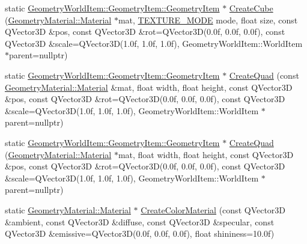 \begin{DoxyCompactItemize}
static \mbox{\hyperlink{class_geometry_engine_1_1_geometry_world_item_1_1_geometry_item_1_1_geometry_item}{Geometry\+World\+Item\+::\+Geometry\+Item\+::\+Geometry\+Item}} $\ast$ \mbox{\hyperlink{class_geometry_engine_1_1_geometry_factory_a63e36d406e73170b39a39e7bbec45231}{Create\+Cube}} (\mbox{\hyperlink{class_geometry_engine_1_1_geometry_material_1_1_material}{Geometry\+Material\+::\+Material}} $\ast$mat, \mbox{\hyperlink{namespace_geometry_engine_a8502c4e17f01f5fe92f879776759e572}{T\+E\+X\+T\+U\+R\+E\+\_\+\+M\+O\+DE}} mode, float size, const Q\+Vector3D \&pos, const Q\+Vector3D \&rot=Q\+Vector3D(0.\+0f, 0.\+0f, 0.\+0f), const Q\+Vector3\+D \&scale=\+Q\+Vector3\+D(1.\+0f, 1.\+0f, 1.\+0f), Geometry\+World\+Item\+::\+World\+Item $\ast$parent=nullptr)
\item 
static \mbox{\hyperlink{class_geometry_engine_1_1_geometry_world_item_1_1_geometry_item_1_1_geometry_item}{Geometry\+World\+Item\+::\+Geometry\+Item\+::\+Geometry\+Item}} $\ast$ \mbox{\hyperlink{class_geometry_engine_1_1_geometry_factory_a8a198efff4ed85106a7bffb65274a5e5}{Create\+Quad}} (const \mbox{\hyperlink{class_geometry_engine_1_1_geometry_material_1_1_material}{Geometry\+Material\+::\+Material}} \&mat, float width, float height, const Q\+Vector3D \&pos, const Q\+Vector3D \&rot=Q\+Vector3D(0.\+0f, 0.\+0f, 0.\+0f), const Q\+Vector3\+D \&scale=\+Q\+Vector3\+D(1.\+0f, 1.\+0f, 1.\+0f), Geometry\+World\+Item\+::\+World\+Item $\ast$parent=nullptr)
\item 
static \mbox{\hyperlink{class_geometry_engine_1_1_geometry_world_item_1_1_geometry_item_1_1_geometry_item}{Geometry\+World\+Item\+::\+Geometry\+Item\+::\+Geometry\+Item}} $\ast$ \mbox{\hyperlink{class_geometry_engine_1_1_geometry_factory_a32b10346ae782021112612556d8afe05}{Create\+Quad}} (\mbox{\hyperlink{class_geometry_engine_1_1_geometry_material_1_1_material}{Geometry\+Material\+::\+Material}} $\ast$mat, float width, float height, const Q\+Vector3D \&pos, const Q\+Vector3D \&rot=Q\+Vector3D(0.\+0f, 0.\+0f, 0.\+0f), const Q\+Vector3\+D \&scale=\+Q\+Vector3\+D(1.\+0f, 1.\+0f, 1.\+0f), Geometry\+World\+Item\+::\+World\+Item $\ast$parent=nullptr)
\item 
static \mbox{\hyperlink{class_geometry_engine_1_1_geometry_material_1_1_material}{Geometry\+Material\+::\+Material}} $\ast$ \mbox{\hyperlink{class_geometry_engine_1_1_geometry_factory_a9f9054831c6e8043bf1ecb4337d06363}{Create\+Color\+Material}} (const Q\+Vector3D \&ambient, const Q\+Vector3D \&diffuse, const Q\+Vector3D \&specular, const Q\+Vector3D \&emissive=Q\+Vector3D(0.\+0f, 0.\+0f, 0.\+0f), float shininess=10.\+0f)

\end{DoxyCompactItemize}
